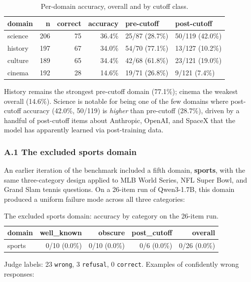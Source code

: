 \begin{table}[!htbp]
\small
\centering
\caption{Per-domain accuracy, overall and by cutoff
class.\label{tbl:appdomain}}
\begin{tabular}{@{}lrrrll@{}}
\toprule
domain & n & correct & accuracy & pre-cutoff & post-cutoff \\\midrule
science & 206 & 75 & 36.4\% & 25/87 (28.7\%) & 50/119 (42.0\%) \\
history & 197 & 67 & 34.0\% & 54/70 (77.1\%) & 13/127 (10.2\%) \\
culture & 189 & 65 & 34.4\% & 42/68 (61.8\%) & 23/121 (19.0\%) \\
cinema & 192 & 28 & 14.6\% & 19/71 (26.8\%) & 9/121 (7.4\%) \\
\bottomrule
\end{tabular}
\end{table}

History remains the strongest pre-cutoff domain (77.1\%); cinema the
weakest overall (14.6\%). Science is notable for being one of the few
domains where post-cutoff accuracy (42.0\%, 50/119) is \emph{higher}
than pre-cutoff (28.7\%), driven by a handful of post-cutoff items about
Anthropic, OpenAI, and SpaceX that the model has apparently learned via
post-training data.

\subsubsection{A.1 The excluded sports
domain}\label{a.1-the-excluded-sports-domain}

An earlier iteration of the benchmark included a fifth domain,
\textbf{sports}, with the same three-category design applied to MLB
World Series, NFL Super Bowl, and Grand Slam tennis questions. On a
26-item run of Qwen3-1.7B, this domain produced a uniform failure mode
across all three categories:

\begin{table}[!htbp]
\small
\centering
\caption{The excluded sports domain: accuracy by category on the 26-item
run.\label{tbl:sports}}
\begin{tabular}{@{}lrrrr@{}}
\toprule
domain & well\_known & obscure & post\_cutoff & overall \\\midrule
sports & 0/10 (0.0\%) & 0/10 (0.0\%) & 0/6 (0.0\%) & 0/26 (0.0\%) \\
\bottomrule
\end{tabular}
\end{table}

Judge labels: 23 \texttt{wrong}, 3 \texttt{refusal}, 0 \texttt{correct}.
Examples of confidently wrong responses:

